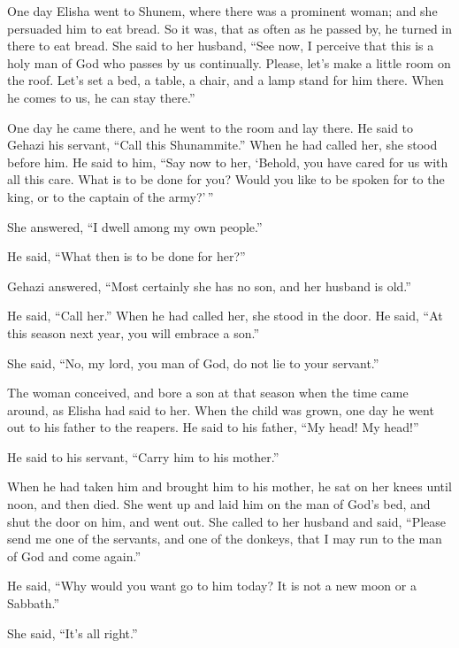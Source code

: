\begin{paracol}{2}
\begin{otherlanguage}{english}
 One day Elisha went to Shunem, where there was a
prominent woman; and she persuaded him to eat bread. So it was, that as
often as he passed by, he turned in there to eat bread. 
She said to her husband, ``See now, I perceive that this is a holy man
of God who passes by us continually.  Please, let's make
a little room on the roof. Let's set a bed, a table, a chair, and a lamp
stand for him there. When he comes to us, he can stay there.''

 One day he came there, and he went to the room and lay
there.  He said to Gehazi his servant, ``Call this
Shunammite.'' When he had called her, she stood before him.
 He said to him, ``Say now to her, `Behold, you have
cared for us with all this care. What is to be done for you? Would you
like to be spoken for to the king, or to the captain of the army?'\,''

She answered, ``I dwell among my own people.''

 He said, ``What then is to be done for her?''

Gehazi answered, ``Most certainly she has no son, and her husband is
old.''

 He said, ``Call her.'' When he had called her, she stood
in the door.  He said, ``At this season next year, you
will embrace a son.''

She said, ``No, my lord, you man of God, do not lie to your servant.''

 The woman conceived, and bore a son at that season when
the time came around, as Elisha had said to her.  When
the child was grown, one day he went out to his father to the reapers.
 He said to his father, ``My head! My head!''

He said to his servant, ``Carry him to his mother.''

 When he had taken him and brought him to his mother, he
sat on her knees until noon, and then died.  She went up
and laid him on the man of God's bed, and shut the door on him, and went
out.  She called to her husband and said, ``Please send
me one of the servants, and one of the donkeys, that I may run to the
man of God and come again.''

 He said, ``Why would you want go to him today? It is not
a new moon or a Sabbath.''

She said, ``It's all right.''


\end{otherlanguage}
\end{paracol}
